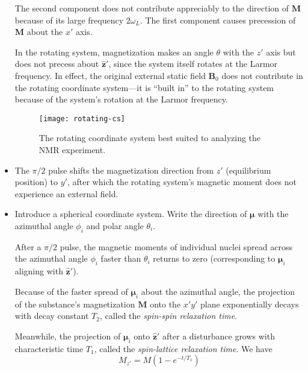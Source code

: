 \documentclass[11pt, a4paper]{article}
\renewcommand{\vec}[1]{\bm{#1}}
\newcommand{\uvec}[1]{\hat{\bm{#1}}}
\newcommand{\m}{\vec{\mu}}  %
\newcommand{\B}{\vec{B}}  %
\newcommand{\M}{\vec{M}}  %
\begin{document}
\begin{itemize}
	The second component does not contribute appreciably to the direction of $ \M $ because of its large frequency $ 2 \omega_{L} $. The first component causes precession of $ \M $ about the $ x' $ axis. 
	
	
	In the rotating system, magnetization makes an angle $ \theta $ with the $ z' $ axis but does not precess about $ \uvec{z}' $, since the system itself rotates at the Larmor frequency. In effect, the original external static field $ \B_{0} $ does not contribute in the rotating coordinate system---it is ``built in'' to the rotating system because of the system's rotation at the Larmor frequency.
	
	\begin{figure}
		\centering
		\texttt{[image: rotating-cs]}
		\caption{The rotating coordinate system best suited to analyzing the NMR experiment.}
		\label{nmr:fig:schematic-rotating-cs}
	\end{figure}
	
	\item The $ \pi/2 $ pulse shifts the magnetization direction from $ z' $ (equilibrium position) to $ y' $, after which the rotating system's magnetic moment does not experience an external field.
	
	\item Introduce a spherical coordinate system. Write the direction of $ \m $ with the azimuthal angle $ \phi_{i} $ and polar angle $ \theta_{i} $.
	
	After a $ \pi/2 $ pulse, the magnetic moments of individual nuclei spread across the azimuthal angle $ \phi_{i} $ faster than $ \theta_{i} $ returns to zero (corresponding to $ \m_{i} $ aligning with $ \uvec{z}' $). 
	
	Because of the faster spread of $ \m_{i} $ about the azimuthal angle, the projection of the substance's magnetization $ \M $ onto the $ x'y' $ plane exponentially decays with decay constant $ T_{2} $, called the \textit{spin-spin relaxation time}.
	
	Meanwhile, the projection of $ \m_{i} $ onto $ \uvec{z}' $ after a disturbance grows with characteristic time $ T_{1} $, called the \textit{spin-lattice relaxation time}. We have
	\begin{equation*}
		M_{z'} = M\left(1 - e^{-t/T_{1}}\right)
	\end{equation*}
\end{itemize}
\end{document}
